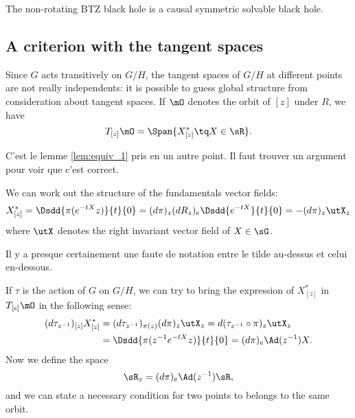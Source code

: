 \begin{corollary}
 The non-rotating BTZ black hole is a causal symmetric solvable black hole.
\end{corollary}
\subsection{A criterion with the tangent spaces}\label{subsec:R_z}

Since $G$ acts transitively on $G/H$, the tangent spaces of $G/H$ at different points are not really independents: it is possible to guess global structure from consideration about tangent spaces. If $\mO$ denotes the orbit of $[z]$ under $R$, we have
\[
   T_{[z]}\mO=\Span\{X^*_{[z]}\tq X\in\sR\}.
\]
\begin{problemeT}
C'est le lemme \ref{lem:equiv_1} pris en un autre point. Il faut trouver un argument pour voir que c'est correct.
\end{problemeT}

We can work out the structure of the fundamentals vector fields:
 \begin{equation}
  X^*_{[z]}=\Dsdd{ \pi(e^{-tX}z) }{t}{0}
	   =(d\pi)_z(dR_z)_e\Dsdd{e^{-tX}}{t}{0}
	   =-(d\pi)_z\utX_z
\end{equation}
where $\utX$ denotes the right invariant vector field of $X\in\sG$. 

\begin{problemeT}
Il y a presque certainement une faute de notation entre le tilde au-dessus et celui en-dessous.
\end{problemeT}

If $\tau$ is the action of $G$ on $G/H$, we can try to bring the expression of $X^*_{[z]}$ in $T_{[e]}\mO$ in the following sense:
\begin{equation}
\begin{split}
(d\tau_{z^{-1}})_{[z]}X^*_{[z]}&=(d\tau_{z^{-1}})_{\pi(z)}(d\pi)_z\utX_z
                              =d(\tau_{z^{-1}}\circ \pi)_z\utX_z\\
			      &=\Dsdd{ \pi( z^{-1} e^{-tX}z ) }{t}{0}
			      =(d\pi)_e\Ad(z^{-1})X.
\end{split}
\end{equation}
Now we define the space
\begin{equation}
\sR_z=(d\pi)_e\Ad(z^{-1})\sR,
\end{equation}
and we can state a necessary condition for two points to belongs to the same orbit.


